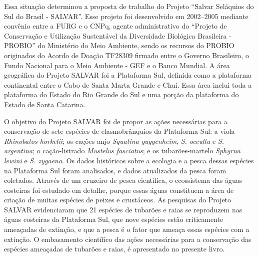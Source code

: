 \documentclass[a4paper,11pt,twoside,showtrims,onecolumn,openright,final]{memoir}
\begin{document}
Essa situação determinou a proposta de trabalho do Projeto ``Salvar Seláquios do Sul do Brasil - SALVAR''. 
Esse projeto foi desenvolvido em 2002--2005 mediante convênio entre a FURG e o CNPq, agente administrativo
do ``Projeto de Conservação e Utilização Sustentável 
da Diversidade Biológica Brasileira - PROBIO'' do Ministério do Meio Ambiente,
sendo os recursos do PROBIO originados do Acordo de Doação TF28309 firmado entre
o Governo Brasileiro, o Fundo Nacional para o Meio Ambiente - GEF e o Banco Mundial. 
A área geográfica do Projeto SALVAR foi a Plataforma Sul, definida como a plataforma continental 
entre o Cabo de Santa Marta Grande e Chuí. Essa área inclui toda a plataforma do Estado 
do Rio Grande do Sul e uma porção da plataforma do Estado de Santa Catarina. 

O objetivo do Projeto SALVAR foi de propor as ações necessárias para a conservação de 
sete espécies de elasmobrânquios da Plataforma Sul: a viola \emph{Rhinobatos horkelii}; 
os cações-anjo \emph{Squatina guggenheim}, \emph{S. occulta} e \emph{S. argentina}; 
o cação-listrado \emph{Mustelus fasciatus}; e os tubarões-martelo \emph{Sphyrna lewini} 
e \emph{S. zygaena}. Os dados históricos sobre a ecologia e a pesca dessas espécies 
na Plataforma Sul foram analisados, e dados atualizados da pesca foram coletados. 
Através de um cruzeiro de pesca científica, o ecossistema das águas costeiras foi 
estudado em detalhe, porque essas águas constituem a área de criação de muitas 
espécies de peixes e crustáceos. As pesquisas do Projeto SALVAR evidenciaram 
que 21 espécies de tubarões e raias se reproduzem nas águas costeiras da Plataforma Sul, 
que nove espécies estão criticamente ameaçadas de extinção, e que a pesca é o fator que 
ameaça essas espécies com a extinção. O embasamento científico das ações necessárias 
para a conservação das espécies ameaçadas de tubarões e raias, é apresentado no presente livro.
\end{document}
